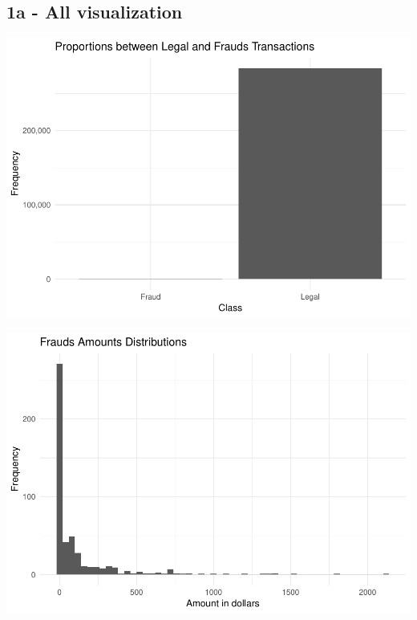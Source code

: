 \documentclass[]{article}
\begin{document}
\hypertarget{a---all-visualization}{%
\subsection{1a - All visualization}\label{a---all-visualization}}

\begin{center}\includegraphics{Credit_Card_Fraud_Detection_Project_Report_files/figure-latex/unnamed-chunk-25-1} \end{center}

\begin{center}\includegraphics{Credit_Card_Fraud_Detection_Project_Report_files/figure-latex/unnamed-chunk-25-2} \end{center}
\end{document}
